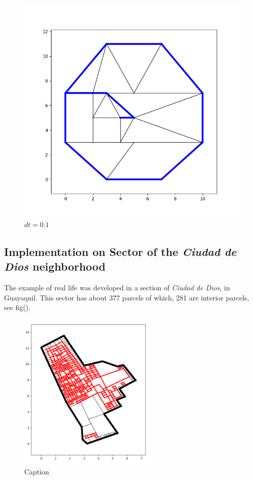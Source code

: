 \documentclass[10pt]{article}
\begin{document}
\begin{figure}[H]
\begin{minipage}{.45\linewidth}
        \includegraphics[width=1\textwidth]{images/Figure_13.png}
        \caption{$dt=0.1$}
        \label{fig:prob1_6_2}
    \end{minipage}
\end{figure}


\subsection{Implementation on Sector of the \emph{Ciudad de Dios} neighborhood}

The example of real life was developed in a section of \emph{Ciudad de Dios}, in Guayaquil. This sector has about 377 parcels of which, 281 are interior parcels, see fig().

\begin{figure}[H]
    \centering
    \includegraphics[width=0.6\textwidth]{images/parcels}
    \caption{Caption}
    \label{fig:my_label}
\end{figure}
\end{document}
